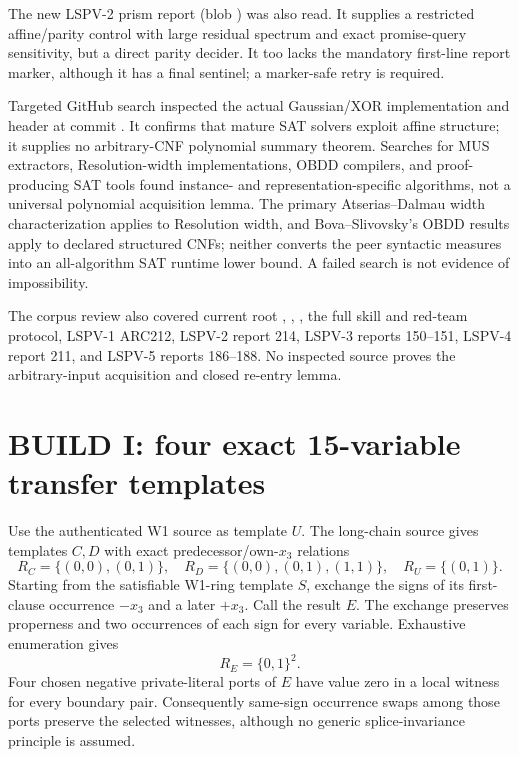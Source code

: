 \documentclass[11pt]{article}
\begin{document}
The new LSPV-2 prism report
(blob ) was also read.  It supplies a restricted affine/parity
control with large residual spectrum and exact promise-query sensitivity,
but a direct parity decider.  It too lacks the mandatory first-line report
marker, although it has a final sentinel; a marker-safe retry is required.

Targeted GitHub search inspected the actual Gaussian/XOR implementation
 and header at commit
.  It confirms that mature SAT solvers exploit affine
structure; it supplies no arbitrary-CNF polynomial summary theorem.
Searches for MUS extractors, Resolution-width implementations, OBDD
compilers, and proof-producing SAT tools found instance- and
representation-specific algorithms, not a universal polynomial acquisition
lemma.  The primary Atserias--Dalmau width characterization applies to
Resolution width, and Bova--Slivovsky's OBDD results apply to declared
structured CNFs; neither converts the peer syntactic measures into an
all-algorithm SAT runtime lower bound.  A failed search is not evidence of
impossibility.

The corpus review also covered current root ,
, , the full  skill and
red-team protocol, LSPV-1 ARC212, LSPV-2 report 214, LSPV-3 reports 150--151,
LSPV-4 report 211, and LSPV-5 reports 186--188.  No inspected source proves
the arbitrary-input acquisition and closed re-entry lemma.

\section{BUILD I: four exact 15-variable transfer templates}
Use the authenticated W1 source as template $U$.  The long-chain source gives
templates $C,D$ with exact predecessor/own-$x_3$ relations
\[
R_C=\{(0,0),(0,1)\},\quad
R_D=\{(0,0),(0,1),(1,1)\},\quad
R_U=\{(0,1)\}.
\]
Starting from the satisfiable W1-ring template $S$, exchange the signs of its
first-clause occurrence $-x_3$ and a later $+x_3$.  Call the result $E$.
The exchange preserves properness and two occurrences of each sign for every
variable.  Exhaustive enumeration gives
\[
 R_E=\{0,1\}^2.
\]
Four chosen negative private-literal ports of $E$ have value zero in a local
witness for every boundary pair.  Consequently same-sign occurrence swaps
among those ports preserve the selected witnesses, although no generic
splice-invariance principle is assumed.
\end{document}
